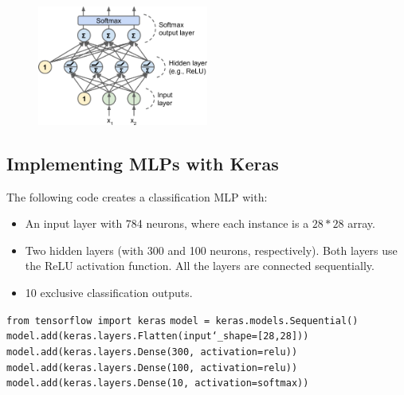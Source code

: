 \begin{figure}[ht]
\centering
\includegraphics[width=0.50\textwidth]{./images/MLP_classification.png}
\end{figure}


\subsection{Implementing MLPs with Keras}

The following code creates a classification MLP with:
\vspace{-5.0mm}
\begin{itemize}
\item
An input layer with 784 neurons, where each instance is a $28*28$ array.
\vspace{-3.0mm}
\item
Two hidden layers (with 300 and 100 neurons, respectively).\newline
Both layers use the ReLU activation function.\newline
All the layers are connected sequentially.
\vspace{-3.0mm}
\item
10 exclusive classification outputs.
\end{itemize}

\vspace{-2.0mm}
\texttt{from tensorflow import keras}\newline
\texttt{model = keras.models.Sequential()}\newline
\texttt{model.add(keras.layers.Flatten(input\char`_shape=[28,28]))}\newline
\texttt{model.add(keras.layers.Dense(300, activation=\textquotesingle relu\textquotesingle))}\newline
\texttt{model.add(keras.layers.Dense(100, activation=\textquotesingle relu\textquotesingle))}\newline
\texttt{model.add(keras.layers.Dense(10, activation=\textquotesingle softmax\textquotesingle))}\newline
\vspace{-2.0mm}

